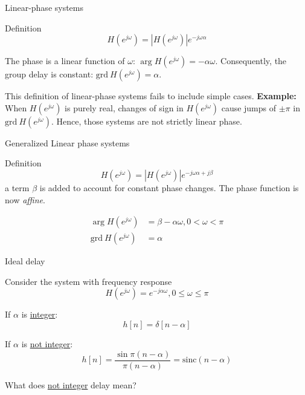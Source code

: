 \documentclass[10pt, handout]{beamer}
\begin{document}
%
\begin{frame}{Linear-phase systems}
\begin{block}{Definition}
	\begin{equation*}
	H(e^{j\omega}) = |H(e^{j\omega})|e^{-j\omega\alpha}
	\end{equation*} 
\end{block}

The phase is a linear function of $\omega$: $\arg H(e^{j\omega}) = -\alpha\omega$. Consequently, the group delay is constant: $\mathrm{grd}~H(e^{j\omega}) = \alpha$.

\vspace{2mm}

This definition of linear-phase systems fails to include simple cases. \textbf{Example:} When  $H(e^{j\omega})$ is purely real, changes of sign in $H(e^{j\omega})$ cause jumps of $\pm\pi$ in $\mathrm{grd}~H(e^{j\omega})$. Hence, those systems are not strictly linear phase.

\end{frame}

\begin{frame}{Generalized Linear phase systems}
\begin{block}{Definition}
	\begin{equation*}
	H(e^{j\omega}) = |H(e^{j\omega})|e^{-j\omega\alpha + j\beta}
	\end{equation*} 
	a term $\beta$ is added to account for constant phase changes. The phase function is now \textit{affine}.
\end{block}

\begin{align*}
\arg H(e^{j\omega}) &= \beta - \alpha\omega, 0 < \omega < \pi \tag{phase}\\
\mathrm{grd}~H(e^{j\omega}) &= \alpha \tag{group delay}
\end{align*}
\end{frame}

\begin{frame}{Ideal delay}

Consider the system with frequency response
\begin{equation*}
H(e^{j\omega}) = e^{-j\alpha\omega}, 0 \leq \omega \leq \pi \tag{ideal delay}
\end{equation*}

If $\alpha$ is \underline{integer}:
\begin{equation*}
h[n] = \delta[n-\alpha] \tag{from DTFT delay property}
\end{equation*}

If $\alpha$ is \underline{not integer}:
\begin{equation*}
h[n] = \frac{\sin \pi(n-\alpha)}{\pi(n-\alpha)} = \mathrm{sinc}(n-\alpha)
\end{equation*}

What does \underline{not integer} delay mean?

\end{frame}
\end{document}
